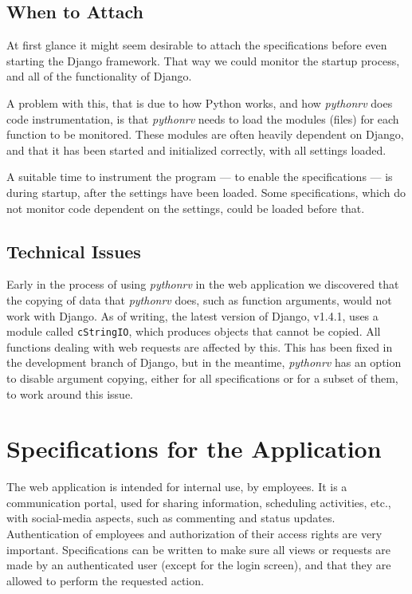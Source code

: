 \subsection{When to Attach}

At first glance it might seem desirable to attach the specifications before
even starting the Django framework. That way we could monitor the startup
process, and all of the functionality of Django.

A problem with this, that is due to how Python works, and how \textit{pythonrv}
does code instrumentation, is that \textit{pythonrv} needs to load the modules
(files) for each function to be monitored. These modules are often heavily
dependent on Django, and that it has been started and initialized correctly,
with all settings loaded.

A suitable time to instrument the program --- to enable the specifications ---
is during startup, after the settings have been loaded. Some specifications,
which do not monitor code dependent on the settings, could be loaded before
that.


\subsection{Technical Issues}

Early in the process of using \textit{pythonrv} in the web application we
discovered that the copying of data that \textit{pythonrv} does, such as
function arguments, would not work with Django. As of writing, the latest
version of Django, v1.4.1, uses a module called \texttt{cStringIO}, which
produces objects that cannot be copied. All functions dealing with web requests
are affected by this. This has been fixed in the development branch of Django,
but in the meantime, \textit{pythonrv} has an option to disable argument
copying, either for all specifications or for a subset of them, to work around
this issue.


\section{Specifications for the Application}

The web application is intended for internal use, by employees. It is a
communication portal, used for sharing information, scheduling activities,
etc., with social-media aspects, such as commenting and status updates.
Authentication of employees and authorization of their access rights are very
important. Specifications can be written to make sure all views or requests
are made by an authenticated user (except for the login screen), and that they
are allowed to perform the requested action.

